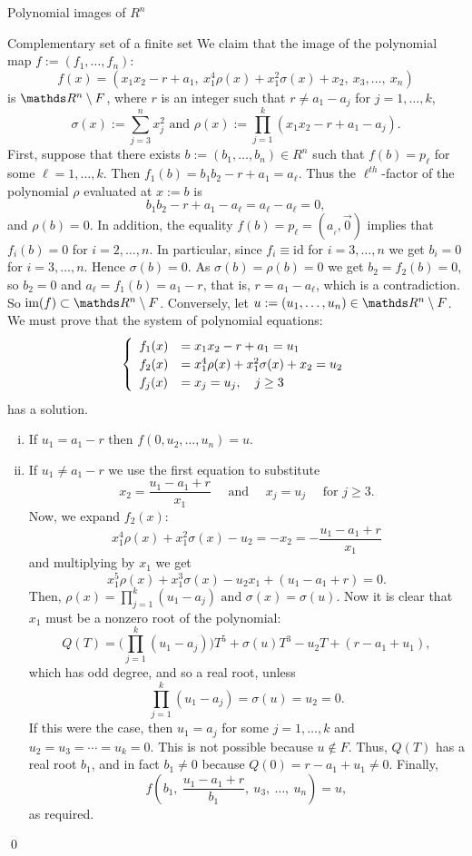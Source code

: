 \documentclass[11pt, a4paper, english, twoside, notitlepage, openright]{report}
\begin{document}
\begin{chapter}{Polynomial images of $R^n$}
\begin{section}{Complementary set of a finite set}
We claim that the image of the polynomial map $f:=(f_1,\dots,f_n)$:
$$
f(x)=\left(x_1x_2-r+a_1,\ x_1^{4}\rho(x)+x_1^{2}\sigma(x)+x_2,\ x_3,\dots,\ x_n\right)
$$
is $\R^n\setminus F$, where $r$ is an integer such that $r\neq a_1-a_j$ for $j=1,\dots,k$,  
$$
\sigma(x):=\sum_{j=3}^n x_j^2 \text{ and } \rho(x):=\prod_{j=1}^k(x_1x_2-r+a_1-a_j).
$$
First, suppose that there exists $b:=(b_{1},\dots,b_{n})\in R^n$ such that $f(b)=p_\ell$ for some $\ell=1,\dots,k$. Then $f_1(b)=b_1b_2-r+a_1=a_\ell$. Thus the $\ell^{th}$-factor of the polynomial $\rho$ evaluated at $x:=b$ is
$$
b_1b_2-r+a_1-a_\ell=a_\ell-a_\ell=0,
$$		 
and $\rho(b)=0$. In addition, the equality $f(b)=p_\ell=(a_{_\ell},\vec{0})$ implies that $f_i(b)=0$ for $i=2,\dots,n$. In particular, since $f_i\equiv\text{id}$ for $i=3,\dots,n$ we get $b_i=0$ for $i=3,\dots,n$. Hence $\sigma(b)=0$. As $\sigma(b)=\rho(b)=0$ we get $b_2=f_2(b)= 0$, so $b_2=0$ and $a_{\ell}=f_1(b)=a_1-r$, that is, $r=a_1-a_\ell$, which is a contradiction. So $\text{im}(f)\subset \R^n\setminus F$.
Conversely, let $u:=(u_1,\dots,u_n)\in\R^n\setminus F$. We must prove that the system of polynomial equations:
\[ \left\{ \def\arraystretch{1.2}
\begin{array}{ll} 
f_1(x)&=x_1x_2-r+a_1=u_1 \\
f_2(x)&=x_1^4\rho(x)+x_1^2\sigma(x)+x_2=u_2 \\
f_j(x)&=x_j=u_j,\quad j\geq 3
\end{array} 
\right.  \]
has a solution.
\begin{enumerate}[(i)]
\item If $u_1=a_1-r$ then $f(0,u_2,\dots,u_n)=u$.
\item If $u_1\neq a_1-r$ we use the first equation to substitute $$x_2=\frac{u_1-a_1+r}{x_1} \quad \text{ and } \quad x_j=u_j \quad \text{ for } j\geq 3.$$ Now, we expand $f_2(x)$:
$$
x_1^4\rho(x)+x_1^2\sigma(x)-u_2=-x_2=-\frac{u_1-a_1+r}{x_1}
$$ 
and multiplying by $x_1$ we get 
$$
x_1^5\rho(x)+x_1^3\sigma(x)-u_2x_1+(u_1-a_1+r)=0.
$$ 
Then, $\rho(x)=\prod_{j=1}^k(u_1-a_j) \text{ and } \sigma(x)=\sigma(u)$. Now it is clear that $x_1$ must be a nonzero root of the polynomial:
$$
Q(T)=\Big(\prod_{j=1}^k(u_1-a_j)\Big)T^{5}+\sigma(u)T^{3}-u_2T+(r-a_1+u_1),
$$
which has odd degree, and so a real root, unless 
$$
\prod_{j=1}^k(u_1-a_j)=\sigma(u)=u_2=0.
$$ 
If this were the case, then $u_1=a_j$ for some $j= 1,\dots,k$ and $u_2=u_3=\cdots=u_k=0$. This is not possible because $u\not\in F$. Thus, $Q(T)$ has a real root $b_1$, and in fact $b_1\neq0$ because $Q(0)=r-a_1+u_1\neq 0$.
Finally, 
$$
f\left(b_1,\ \frac{u_1-a_1+r}{b_1},\ u_3,\ \dots,\ u_n\right)=u,
$$
as required.
\end{enumerate}
\qed
\end{section}


\end{chapter}
\end{document}
